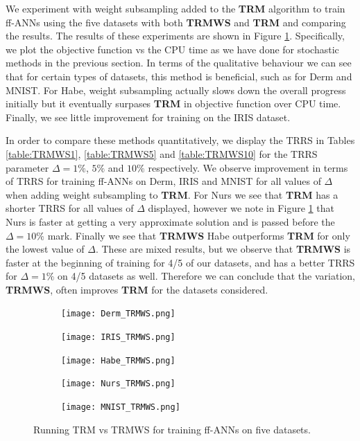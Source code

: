\documentclass[letterpaper,12pt,titlepage,oneside,final]{book}
\begin{document}
	We experiment with weight subsampling added to the \textbf{TRM} algorithm to train ff-ANNs using the five datasets with both \textbf{TRMWS} and \textbf{TRM} and comparing the results. The results of these experiments are shown in Figure \ref{figure:TRMWS}. Specifically, we plot the objective function vs the CPU time as we have done for stochastic methods in the previous section. In terms of the qualitative behaviour we can see that for certain types of datasets, this method is beneficial, such as for Derm and MNIST. For Habe, weight subsampling actually slows down the overall progress initially but it eventually surpases \textbf{TRM} in objective function over CPU time. Finally, we see little improvement for training on the IRIS dataset. 
	
	In order to compare these methods quantitatively, we display the TRRS in Tables \ref{table:TRMWS1}, \ref{table:TRMWS5} and \ref{table:TRMWS10} for the TRRS parameter $\Delta = 1\%$, $5\%$ and $10\%$ respectively. We observe improvement in terms of TRRS for training ff-ANNs on Derm, IRIS and MNIST for all values of $\Delta$ when adding weight subsampling to \textbf{TRM}. For Nurs we see that \textbf{TRM} has a shorter TRRS for all values of $\Delta$ displayed, however we note in Figure \ref{figure:TRMWS} that Nurs is faster at getting a very approximate solution and is passed before the $\Delta=10\%$ mark. Finally we see that \textbf{TRMWS} Habe outperforms \textbf{TRM} for only the lowest value of $\Delta$. These are mixed results, but we observe that \textbf{TRMWS} is faster at the beginning of training for 4/5 of our datasets, and has a better TRRS for $\Delta=1\%$ on 4/5 datasets as well. Therefore we can conclude that the variation, \textbf{TRMWS}, often improves \textbf{TRM} for the datasets considered.
	
	
	\begin{figure}
		\centering
		\begin{subfigure}{.45\textwidth}
			\texttt{[image: Derm\_TRMWS.png]}
		\end{subfigure}
		\begin{subfigure}{.45\textwidth}
			\texttt{[image: IRIS\_TRMWS.png]}
		\end{subfigure}
		\begin{subfigure}{.45\textwidth}
			\texttt{[image: Habe\_TRMWS.png]}
		\end{subfigure}
		\begin{subfigure}{.45\textwidth}
			\texttt{[image: Nurs\_TRMWS.png]}
		\end{subfigure}
		\begin{subfigure}{.45\textwidth}
			\texttt{[image: MNIST\_TRMWS.png]}
		\end{subfigure}
		\caption{Running TRM vs TRMWS for training ff-ANNs on five datasets.}
		\label{figure:TRMWS}
	\end{figure}
	
\end{document}
